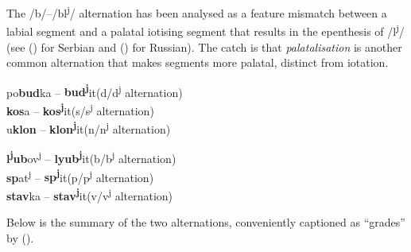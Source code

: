 \documentclass[a4paper, 12pt]{article}
\newcommand{\citeay}[2][]{
   \citeauthor{#2} (\citeyear[#1]{#2})}
\begin{document}
	\noindent The /b/--/bl\textsuperscript{j}/ alternation has been analysed as a feature mismatch between a labial segment and a palatal iotising segment that results in the epenthesis of /l\textsuperscript{j}/ (see \citeay{moren2006} for Serbian and \citeay{magomedova2017} for Russian). The catch is that \emph{palatalisation} is another common alternation that makes segments more palatal, distinct from iotation.
	
\begin{minipage}[t]{0.47\linewidth}
	\ex[aboveexskip=.7em]\label{t:pltz}po\textbf{bud}ka -- \textbf{bud\textsuperscript{j}}it\hfill(d/d\textsuperscript{j} alternation)\\
		\textbf{kos}a -- \textbf{kos\textsuperscript{j}}it\hfill (s/s\textsuperscript{j} alternation)\\
		u\textbf{klon}  -- \textbf{klon\textsuperscript{j}}it\hfill(n/n\textsuperscript{j} alternation)
	\xe
\end{minipage}
\hfill
\begin{minipage}[t]{0.45\linewidth}
	\ex[aboveexskip=.7em]\label{t:pltz-end}\textbf{l\textsuperscript{j}ub}ov\textsuperscript{j} -- \textbf{lyub\textsuperscript{j}}it\hfill(b/b\textsuperscript{j}  alternation)\\
		\textbf{sp}at\textsuperscript{j}  -- \textbf{sp\textsuperscript{j}}it\hfill(p/p\textsuperscript{j}  alternation)\\
		\textbf{stav}ka  -- \textbf{stav\textsuperscript{j}}it\hfill(v/v\textsuperscript{j}  alternation)
	\xe
\end{minipage}

	\noindent Below is the summary of the two alternations, conveniently captioned as ``grades'' by \citeay{brown1998}.\newpage
	
\end{document}
